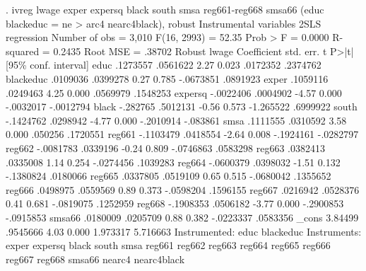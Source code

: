 . ivreg lwage exper expersq black south smsa reg661-reg668 smsa66 (educ blackeduc = ne
> arc4 nearc4black), robust
{\smallskip}
Instrumental variables 2SLS regression          Number of obs     =      3,010
                                                F(16, 2993)       =      52.35
                                                Prob > F          =     0.0000
                                                R-squared         =     0.2435
                                                Root MSE          =     .38702
{\smallskip}
             {\VBAR}               Robust
       lwage {\VBAR} Coefficient  std. err.      t    P>|t|     [95\% conf. interval]
        educ {\VBAR}   .1273557   .0561622     2.27   0.023     .0172352    .2374762
   blackeduc {\VBAR}   .0109036   .0399278     0.27   0.785    -.0673851    .0891923
       exper {\VBAR}   .1059116   .0249463     4.25   0.000     .0569979    .1548253
     expersq {\VBAR}  -.0022406   .0004902    -4.57   0.000    -.0032017   -.0012794
       black {\VBAR}   -.282765   .5012131    -0.56   0.573    -1.265522    .6999922
       south {\VBAR}  -.1424762   .0298942    -4.77   0.000    -.2010914    -.083861
        smsa {\VBAR}   .1111555   .0310592     3.58   0.000      .050256    .1720551
      reg661 {\VBAR}  -.1103479   .0418554    -2.64   0.008    -.1924161   -.0282797
      reg662 {\VBAR}  -.0081783   .0339196    -0.24   0.809    -.0746863    .0583298
      reg663 {\VBAR}   .0382413   .0335008     1.14   0.254    -.0274456    .1039283
      reg664 {\VBAR}  -.0600379   .0398032    -1.51   0.132    -.1380824    .0180066
      reg665 {\VBAR}   .0337805   .0519109     0.65   0.515    -.0680042    .1355652
      reg666 {\VBAR}   .0498975   .0559569     0.89   0.373    -.0598204    .1596155
      reg667 {\VBAR}   .0216942   .0528376     0.41   0.681    -.0819075    .1252959
      reg668 {\VBAR}  -.1908353   .0506182    -3.77   0.000    -.2900853   -.0915853
      smsa66 {\VBAR}   .0180009   .0205709     0.88   0.382    -.0223337    .0583356
       _cons {\VBAR}    3.84499   .9545666     4.03   0.000     1.973317    5.716663
Instrumented: educ blackeduc
 Instruments: exper expersq black south smsa reg661 reg662 reg663 reg664
              reg665 reg666 reg667 reg668 smsa66 nearc4 nearc4black
{\smallskip}
